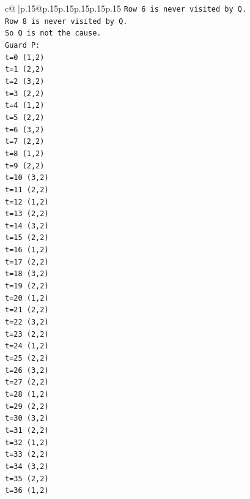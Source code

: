\documentclass{article}
\begin{document}
{\begin{supertabular}{c@{$\;$}|p{.15\linewidth}@{}p{.15\linewidth}p{.15\linewidth}p{.15\linewidth}p{.15\linewidth}p{.15\linewidth}}
{{{\texttt{Row 6 is never visited by Q.} \\
\texttt{Row 8 is never visited by Q.} \\
\texttt{So Q is not the cause.} \\
\texttt{Guard P:} \\
\texttt{t=0 (1,2)} \\
\texttt{t=1 (2,2)} \\
\texttt{t=2 (3,2)} \\
\texttt{t=3 (2,2)} \\
\texttt{t=4 (1,2)} \\
\texttt{t=5 (2,2)} \\
\texttt{t=6 (3,2)} \\
\texttt{t=7 (2,2)} \\
\texttt{t=8 (1,2)} \\
\texttt{t=9 (2,2)} \\
\texttt{t=10 (3,2)} \\
\texttt{t=11 (2,2)} \\
\texttt{t=12 (1,2)} \\
\texttt{t=13 (2,2)} \\
\texttt{t=14 (3,2)} \\
\texttt{t=15 (2,2)} \\
\texttt{t=16 (1,2)} \\
\texttt{t=17 (2,2)} \\
\texttt{t=18 (3,2)} \\
\texttt{t=19 (2,2)} \\
\texttt{t=20 (1,2)} \\
\texttt{t=21 (2,2)} \\
\texttt{t=22 (3,2)} \\
\texttt{t=23 (2,2)} \\
\texttt{t=24 (1,2)} \\
\texttt{t=25 (2,2)} \\
\texttt{t=26 (3,2)} \\
\texttt{t=27 (2,2)} \\
\texttt{t=28 (1,2)} \\
\texttt{t=29 (2,2)} \\
\texttt{t=30 (3,2)} \\
\texttt{t=31 (2,2)} \\
\texttt{t=32 (1,2)} \\
\texttt{t=33 (2,2)} \\
\texttt{t=34 (3,2)} \\
\texttt{t=35 (2,2)} \\
\texttt{t=36 (1,2)} \\
}}}
\end{supertabular}}
\end{document}
